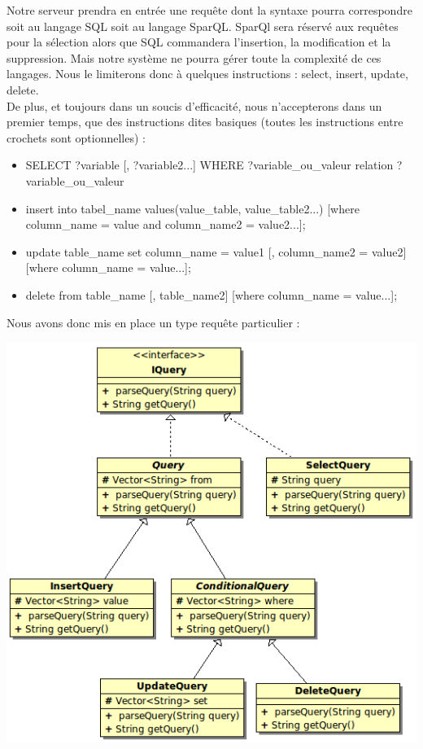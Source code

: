 \documentclass[12pt]{article}
\begin{document}
	Notre serveur prendra en entrée une requête dont la syntaxe pourra correspondre soit au langage SQL soit au langage SparQL. SparQl sera réservé aux requêtes pour la sélection alors que SQL commandera l'insertion, la modification et la suppression. Mais notre système ne pourra gérer toute la complexité de ces langages. Nous le limiterons donc à quelques instructions : select, insert, update, delete.\\
	De plus, et toujours dans un soucis d'efficacité, nous n'accepterons dans un premier temps, que des instructions dites basiques (toutes les instructions entre crochets sont optionnelles) :\\
	\begin{itemize}
	\item SELECT ?variable [, ?variable2...] WHERE {?variable\_ou\_valeur relation ?variable\_ou\_valeur}\\
	\item insert into tabel\_name values(value\_table, value\_table2...) [where column\_name = value and column\_name2 = value2...];\\
	\item update table\_name set column\_name = value1 [, column\_name2  = value2] [where column\_name = value...];\\
	\item delete from table\_name [, table\_name2] [where column\_name = value...];\\
	\end{itemize}
	Nous avons donc mis en place un type requête particulier :\\

\begin{center}
	\includegraphics[scale=0.70]{images/QueryHierarchie.png}
\end{center}
\end{document}
